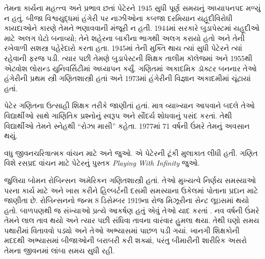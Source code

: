 તેમના કાર્યના મહત્ત્વ અને
પ્રભાવ છતાં પેટેરને 1945 સુધી
પૂર્ણ સમયનું અધ્યાપનપદ મળ્યું
ન હતું. બીજા વિશ્વયુદ્ધમાં
હંગેરી પર નાઝીઓના કબજા
દરમિયાન યહૂદીવિરોધી કાયદાઓને
કારણે તેમને ભણાવવાની
મંજૂરી ન હતી. 1944માં સરકારે
બુડાપેસ્ટમાં યહૂદીઓ માટે
અલગ ઘેટો બનાવ્યો; તેને
શહેરના બાકીના ભાગથી
અલગ કરાયો હતો અને તેની
રખેવાળી સશસ્ત્ર પહેરેદારો
કરતા હતા. 1945માં તેની
મુક્તિ થાય ત્યાં સુધી
પેટેરને ત્યાં રહેવાની
ફરજ પડી. ત્યાર પછી
તેમણે બુડાપેસ્ટની શિક્ષક
તાલીમ કૉલેજમાં અને
1955થી એટ્વોશ લોરાન્ડ
યુનિવર્સિટીમાં અધ્યાપન
કર્યું. ગણિતમાં અકાદમિક
ડૉક્ટર બનનાર તેઓ
હંગેરીની પ્રથમ સ્ત્રી
ગણિતશાસ્ત્રી હતાં અને
1973માં હંગેરીની વિજ્ઞાન
અકાદમીમાં ચૂંટાયાં હતાં.

પેટેર ગણિતના ઉત્સાહી
શિક્ષક તરીકે જાણીતાં હતાં.
માત્ર વ્યાખ્યાન આપવાને
બદલે તેઓ વિદ્યાર્થીઓ
સાથે ગાણિતિક પ્રશ્નોનું
સ્વરૂપ અને સૌંદર્ય શોધવાનું
પસંદ કરતાં. તેથી વિદ્યાર્થીઓ
તેમને સ્નેહથી “રોઝા માસી”
કહેતા. 1977માં 71 વર્ષની
ઉંમરે તેમનું અવસાન થયું.


\begin{reading}
વધુ જીવનચરિત્રાત્મક વાંચન માટે
\citep{Oconnor2014} અને
\citep{Andrasfai1986} જુઓ.
\citet{Tamassy1994}એ પેટેરની
ટૂંકી મુલાકાત લીધી હતી.
ગણિત વિશે રસપ્રદ વાંચન
માટે પેટેરનું પુસ્તક
\emph{Playing With Infinity}
\citep{Peter2010} જુઓ.
\end{reading}
\endgroup


\begingroup
\makeatletter{}\makeatother


\label{guunit:OLP-0628}



જુલિયા બોમન રોબિન્સન અમેરિકન ગણિતશાસ્ત્રી
હતાં. તેઓ મુખ્યત્વે નિર્ણય સમસ્યાઓ પરના
કાર્ય માટે અને ખાસ કરીને હિલ્બર્ટની
દસમી સમસ્યાના ઉકેલમાં પોતાના પ્રદાન
માટે જાણીતા છે. રોબિન્સનનો જન્મ
8 ડિસેમ્બર 1919ના રોજ મિઝૂરીના
સેન્ટ લૂઇસમાં થયો હતો. બાળપણથી જ
સંખ્યાઓ પ્રત્યે આકર્ષણ હતું એવું
તેઓ યાદ કરતાં \citep[4]{Reid1986}.
નવ વર્ષની ઉંમરે તેમને લાલ તાવ
થયો અને ત્યાર પછી સંધિવા તાવના
વારંવાર હુમલા થયા. તેથી ઘણો
સમય પથારીમાં વિતાવવો પડ્યો અને
તેઓ અભ્યાસમાં પાછળ પડી ગયાં.
ખાનગી શિક્ષકોની મદદથી અભ્યાસમાં
બીજાઓની બરાબરી કરી શક્યાં,
પરંતુ બીમારીની શારીરિક અસરો
તેમના જીવનમાં લાંબા સમય
સુધી રહી.

